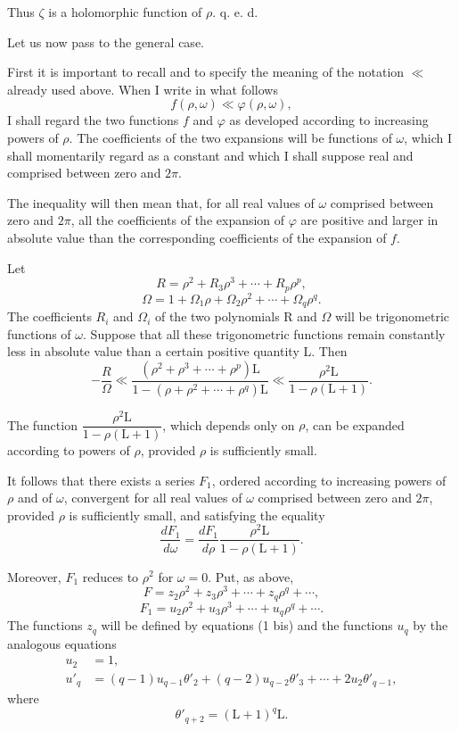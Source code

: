 \documentclass[11pt]{article}
\begin{document}
Thus $\zeta$ is a holomorphic function of $\rho$. \hfill q. e. d.

Let us now pass to the general case.

First it is important to recall and to specify the meaning of the notation $\ll$ already used above. When I write in what follows
\[
f(\rho,\omega)\ll\varphi(\rho,\omega),
\]
I shall regard the two functions $f$ and $\varphi$ as developed according to increasing powers of $\rho$. The coefficients of the two expansions will be functions of $\omega$, which I shall momentarily regard as a constant and which I shall suppose real and comprised between zero and $2\pi$.

The inequality will then mean that, for all real values of $\omega$ comprised between zero and $2\pi$, all the coefficients of the expansion of $\varphi$ are positive and larger in absolute value than the corresponding coefficients of the expansion of $f$.

Let
\[
R=\rho^2+R_3\rho^3+\cdots+R_p\rho^p,
\]
\[
\Omega=1+\Omega_1\rho+\Omega_2\rho^2+\cdots+\Omega_q\rho^q.
\]
The coefficients $R_i$ and $\Omega_i$ of the two polynomials R and $\Omega$ will be trigonometric functions of $\omega$. Suppose that all these trigonometric functions remain constantly less in absolute value than a certain positive quantity L. Then
\begin{equation}\tag{6}
-\frac{R}{\Omega}
\ll
\frac{(\rho^2+\rho^3+\cdots+\rho^p)\mathrm L}{1-(\rho+\rho^2+\cdots+\rho^q)\mathrm L}
\ll
\frac{\rho^2\mathrm L}{1-\rho(\mathrm L+1)}.
\end{equation}

The function $\dfrac{\rho^2\mathrm L}{1-\rho(\mathrm L+1)}$, which depends only on $\rho$, can be expanded according to powers of $\rho$, provided $\rho$ is sufficiently small.

It follows that there exists a series $F_1$, ordered according to increasing powers of $\rho$ and of $\omega$, convergent for all real values of $\omega$ comprised between zero and $2\pi$, provided $\rho$ is sufficiently small, and satisfying the equality
\[
\frac{dF_1}{d\omega}=\frac{dF_1}{d\rho}\frac{\rho^2\mathrm L}{1-\rho(\mathrm L+1)}.
\]

Moreover, $F_1$ reduces to $\rho^2$ for $\omega=0$. Put, as above,
\[
F=z_2\rho^2+z_3\rho^3+\cdots+z_q\rho^q+\cdots,
\]
\[
F_1=u_2\rho^2+u_3\rho^3+\cdots+u_q\rho^q+\cdots.
\]
The functions $z_q$ will be defined by equations (1 bis) and the functions $u_q$ by the analogous equations
\begin{equation}\tag{7}
\begin{aligned}
u_2&=1,\\
u'_q&=(q-1)u_{q-1}\theta'_2+(q-2)u_{q-2}\theta'_3+\cdots+2u_2\theta'_{q-1},
\end{aligned}
\end{equation}
where
\[
\theta'_{q+2}=(\mathrm L+1)^q\mathrm L.
\]
\end{document}
